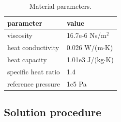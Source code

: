 \begin{table}[h]
\caption{Material parameters.}
\label{tb:matpam}
\begin{center}
\begin{tabular}{ll} \hline
parameter  & value \\ \hline
viscosity & 16.7e-6 Ns/m$^{2}$  \\
heat conductivity & 0.026 W/(m$\cdot$K) \\
heat capacity & 1.01e3 J/(kg$\cdot$K) \\
specific heat ratio & 1.4        \\
reference pressure & 1e5 Pa      \\ \hline
\end{tabular}
\end{center}
\end{table}


\subsection*{Solution procedure}

